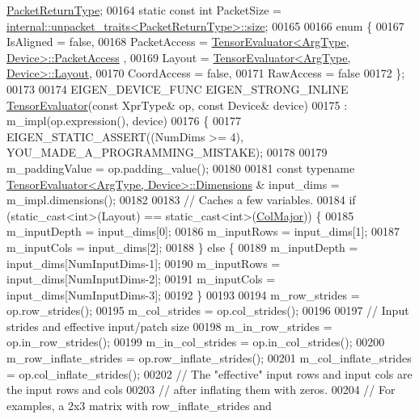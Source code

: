 \begin{DoxyCode}
      \hyperlink{group___sparse_core___module}{PacketReturnType};
00164   \textcolor{keyword}{static} \textcolor{keyword}{const} \textcolor{keywordtype}{int} PacketSize = 
      \hyperlink{struct_eigen_1_1internal_1_1unpacket__traits}{internal::unpacket\_traits<PacketReturnType>::size};
00165 
00166   \textcolor{keyword}{enum} \{
00167     IsAligned = \textcolor{keyword}{false},
00168     PacketAccess = \hyperlink{struct_eigen_1_1_tensor_evaluator}{TensorEvaluator<ArgType, Device>::PacketAccess}
      ,
00169     Layout = \hyperlink{struct_eigen_1_1_tensor_evaluator}{TensorEvaluator<ArgType, Device>::Layout},
00170     CoordAccess = \textcolor{keyword}{false},
00171     RawAccess = \textcolor{keyword}{false}
00172   \};
00173 
00174   EIGEN\_DEVICE\_FUNC EIGEN\_STRONG\_INLINE \hyperlink{struct_eigen_1_1_tensor_evaluator}{TensorEvaluator}(\textcolor{keyword}{const} XprType& op, \textcolor{keyword}{const} Device& 
      device)
00175       : m\_impl(op.expression(), device)
00176   \{
00177     EIGEN\_STATIC\_ASSERT((NumDims >= 4), YOU\_MADE\_A\_PROGRAMMING\_MISTAKE);
00178 
00179     m\_paddingValue = op.padding\_value();
00180 
00181     \textcolor{keyword}{const} \textcolor{keyword}{typename} \hyperlink{struct_eigen_1_1_tensor_evaluator}{TensorEvaluator<ArgType, Device>::Dimensions}
      & input\_dims = m\_impl.dimensions();
00182 
00183     \textcolor{comment}{// Caches a few variables.}
00184     \textcolor{keywordflow}{if} (static\_cast<int>(Layout) == static\_cast<int>(\hyperlink{group__enums_ggaacded1a18ae58b0f554751f6cdf9eb13a0cbd4bdd0abcfc0224c5fcb5e4f6669a}{ColMajor})) \{
00185       m\_inputDepth = input\_dims[0];
00186       m\_inputRows = input\_dims[1];
00187       m\_inputCols = input\_dims[2];
00188     \} \textcolor{keywordflow}{else} \{
00189       m\_inputDepth = input\_dims[NumInputDims-1];
00190       m\_inputRows = input\_dims[NumInputDims-2];
00191       m\_inputCols = input\_dims[NumInputDims-3];
00192     \}
00193 
00194     m\_row\_strides = op.row\_strides();
00195     m\_col\_strides = op.col\_strides();
00196 
00197     \textcolor{comment}{// Input strides and effective input/patch size}
00198     m\_in\_row\_strides = op.in\_row\_strides();
00199     m\_in\_col\_strides = op.in\_col\_strides();
00200     m\_row\_inflate\_strides = op.row\_inflate\_strides();
00201     m\_col\_inflate\_strides = op.col\_inflate\_strides();
00202     \textcolor{comment}{// The "effective" input rows and input cols are the input rows and cols}
00203     \textcolor{comment}{// after inflating them with zeros.}
00204     \textcolor{comment}{// For examples, a 2x3 matrix with row\_inflate\_strides and}

\end{DoxyCode}
